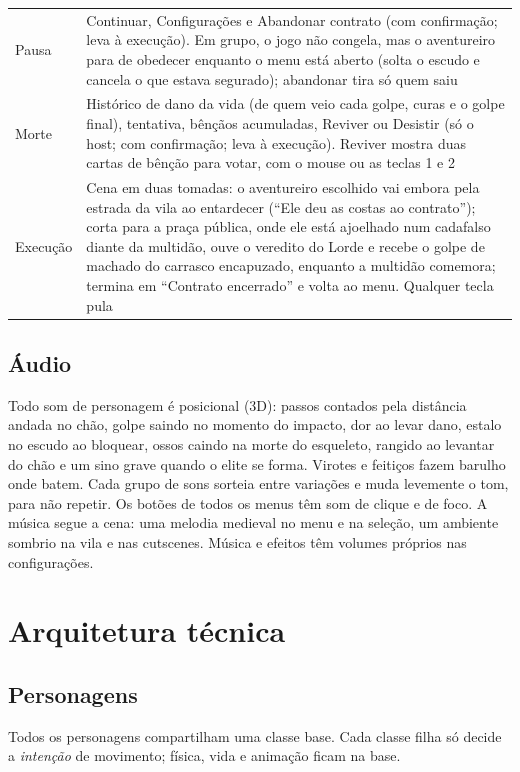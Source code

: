\documentclass[11pt,a4paper]{article}
\begin{document}
\begin{tabularx}{\textwidth}{@{}lX@{}}
Pausa & Continuar, Configurações e Abandonar contrato (com confirmação; leva à execução). Em grupo, o jogo não congela, mas o aventureiro para de obedecer enquanto o menu está aberto (solta o escudo e cancela o que estava segurado); abandonar tira só quem saiu \\
Morte & Histórico de dano da vida (de quem veio cada golpe, curas e o golpe final), tentativa, bênçãos acumuladas, Reviver ou Desistir (só o host; com confirmação; leva à execução). Reviver mostra duas cartas de bênção para votar, com o mouse ou as teclas 1 e 2 \\
Execução & Cena em duas tomadas: o aventureiro escolhido vai embora pela estrada da vila ao entardecer (``Ele deu as costas ao contrato''); corta para a praça pública, onde ele está ajoelhado num cadafalso diante da multidão, ouve o veredito do Lorde e recebe o golpe de machado do carrasco encapuzado, enquanto a multidão comemora; termina em ``Contrato encerrado'' e volta ao menu. Qualquer tecla pula \\
\bottomrule
\end{tabularx}

\subsection{Áudio}

Todo som de personagem é posicional (3D): passos contados pela distância andada no chão, golpe saindo no momento do impacto, dor ao levar dano, estalo no escudo ao bloquear, ossos caindo na morte do esqueleto, rangido ao levantar do chão e um sino grave quando o elite se forma. Virotes e feitiços fazem barulho onde batem. Cada grupo de sons sorteia entre variações e muda levemente o tom, para não repetir. Os botões de todos os menus têm som de clique e de foco. A música segue a cena: uma melodia medieval no menu e na seleção, um ambiente sombrio na vila e nas cutscenes. Música e efeitos têm volumes próprios nas configurações.

\section{Arquitetura técnica}

\subsection{Personagens}

Todos os personagens compartilham uma classe base. Cada classe filha só decide a \emph{intenção} de movimento; física, vida e animação ficam na base.
\end{document}

